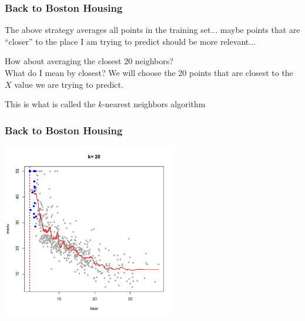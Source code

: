 \documentclass[flegn]{beamer}
\newcommand{\sko}{\vspace{.1in}}
\begin{document}
\begin{frame}
\frametitle{Back to Boston Housing}
The above strategy averages all points in the training set... maybe points that are {\color{blue}``closer''} to the place I am trying to predict should be more relevant... 

\sko

How about averaging the closest 20 neighbors?  \\ {\color{red}What do I mean by closest?} We will choose the 20 points that are closest to the $X$ value we are trying to predict.

\sko

This is what is called the {\color{blue}$k$-nearest neighbors} algorithm

\end{frame}


\begin{frame}
\frametitle{Back to Boston Housing}

\vspace{-0.7cm}
\begin{center}
\includegraphics[width=3in]{k20-1}
\end{center}
\end{frame}
\end{document}
